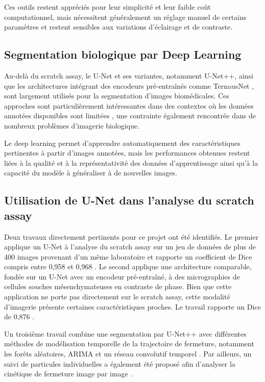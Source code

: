 \documentclass[12pt,a4paper]{report}
\begin{document}
Ces outils restent appréciés pour leur simplicité et leur faible coût computationnel, mais nécessitent généralement un réglage manuel de certains paramètres et restent sensibles aux variations d'éclairage et de contraste.

\subsection{Segmentation biologique par Deep Learning}

Au-delà du scratch assay, le U-Net et ses variantes, notamment U-Net++, ainsi que les architectures intégrant des encodeurs pré-entraînés comme TernausNet \cite{ref4}, sont largement utilisés pour la segmentation d'images biomédicales. Ces approches sont particulièrement intéressantes dans des contextes où les données annotées disponibles sont limitées \cite{ref5}, une contrainte également rencontrée dans de nombreux problèmes d'imagerie biologique.

Le deep learning permet d'apprendre automatiquement des caractéristiques pertinentes à partir d'images annotées, mais les performances obtenues restent liées à la qualité et à la représentativité des données d'apprentissage ainsi qu'à la capacité du modèle à généraliser à de nouvelles images.

\subsection{Utilisation de U-Net dans l'analyse du scratch assay}

Deux travaux directement pertinents pour ce projet ont été identifiés. Le premier applique un U-Net à l'analyse du scratch assay sur un jeu de données de plus de 400 images provenant d'un même laboratoire et rapporte un coefficient de Dice compris entre 0,958 et 0,968 \cite{ref2}. Le second applique une architecture comparable, fondée sur un U-Net avec un encodeur pré-entraîné, à des micrographies de cellules souches mésenchymateuses en contraste de phase. Bien que cette application ne porte pas directement sur le scratch assay, cette modalité d'imagerie présente certaines caractéristiques proches. Le travail rapporte un Dice de 0,876 \cite{ref3}.

Un troisième travail combine une segmentation par U-Net++ avec différentes méthodes de modélisation temporelle de la trajectoire de fermeture, notamment les forêts aléatoires, ARIMA et un réseau convolutif temporel \cite{ref12}. Par ailleurs, un suivi de particules individuelles a également été proposé afin d'analyser la cinétique de fermeture image par image \cite{ref11}.
\end{document}

